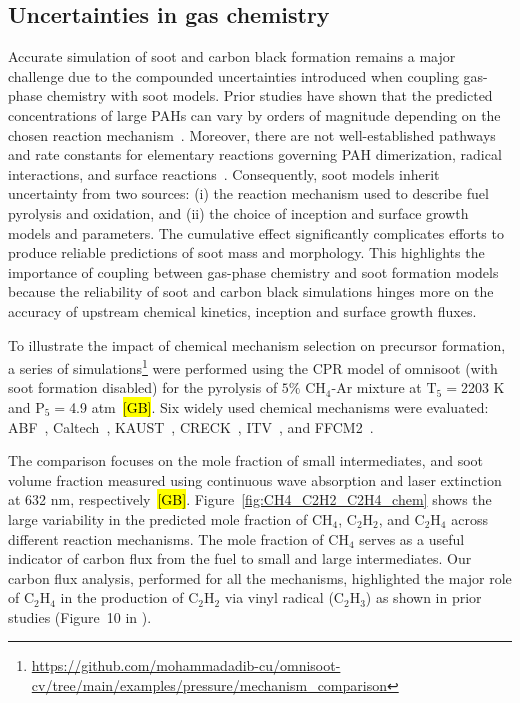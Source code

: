 \subsection{Uncertainties in gas chemistry}
\label{sec:uncergaschem}
Accurate simulation of soot and carbon black formation remains a major challenge due to the compounded uncertainties introduced when coupling gas-phase chemistry with soot models. Prior studies have shown that the predicted concentrations of large PAHs can vary by orders of magnitude depending on the chosen reaction mechanism~\citep{wang2023systematic}. Moreover, there are not well-established pathways and rate constants for elementary reactions governing PAH dimerization, radical interactions, and surface reactions~\citep{martin2022soot}. Consequently, soot models inherit uncertainty from two sources: (i) the reaction mechanism used to describe fuel pyrolysis and oxidation, and (ii) the choice of inception and surface growth models and parameters. The cumulative effect significantly complicates efforts to produce reliable predictions of soot mass and morphology. This highlights the importance of coupling between gas-phase chemistry and soot formation models because the reliability of soot and carbon black simulations hinges more on the accuracy of upstream chemical kinetics, inception and surface growth fluxes.

To illustrate the impact of chemical mechanism selection on precursor formation, a series of simulations\footnote{\href{https://github.com/mohammadadib-cu/omnisoot-cv/tree/main/examples/pressure/mechanism_comparison}{https://github.com/mohammadadib-cu/omnisoot-cv/tree/main/examples/pressure/mechanism\_comparison}} were performed using the CPR model of omnisoot (with soot formation disabled) for the pyrolysis of $5\%$ $\mathrm{CH_4}$-Ar mixture at $\mathrm{T_5}=$2203 K and $\mathrm{P_5}=$4.9 atm~\hl{[GB]}. Six widely used chemical mechanisms were evaluated: ABF~\citep{appel2000kinetic}, Caltech~\citep{blanquart2009chemical}, KAUST~\citep{wang2013pah}, CRECK~\citep{saggese2015kinetic}, ITV~\citep{hellmuth2024role}, and FFCM2~\citep{ZDV2023}.

The comparison focuses on the mole fraction of small intermediates, and soot volume fraction measured using continuous wave absorption and laser extinction at 632 nm, respectively~\hl{[GB]}. Figure~\ref{fig:CH4_C2H2_C2H4_chem} shows the large variability in the predicted mole fraction of $\mathrm{CH_4}$, $\mathrm{C_2H_2}$, and $\mathrm{C_2H_4}$ across different reaction mechanisms. The mole fraction of $\mathrm{CH_4}$ serves as a useful indicator of carbon flux from the fuel to small and large intermediates. Our carbon flux analysis, performed for all the mechanisms, highlighted the major role of $\mathrm{C_2H_4}$ in the production of $\mathrm{C_2H_2}$ via vinyl radical ($\mathrm{C_2H_3}$) as shown in prior studies (Figure~10 in \citep{wang2023systematic}). 

